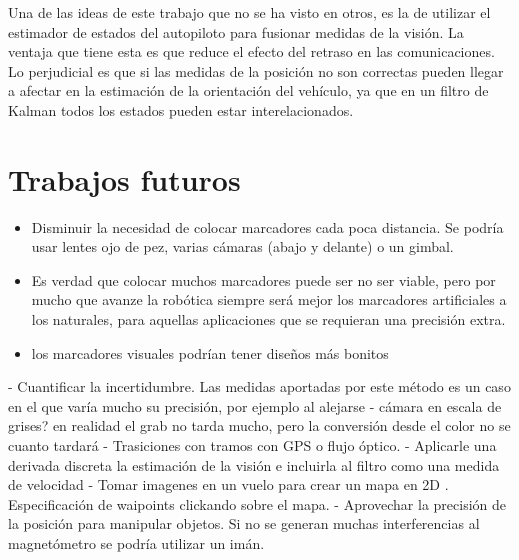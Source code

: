 Una de las ideas de este trabajo que no se ha visto en otros, es la de utilizar el estimador de estados del autopiloto para fusionar medidas de la visión. La ventaja que tiene esta es que reduce el efecto del retraso en las comunicaciones. Lo perjudicial es que si las medidas de la posición no son correctas pueden llegar a afectar en la estimación de la orientación del vehículo, ya que en un filtro de Kalman todos los estados pueden estar interelacionados. 



 





\chapter{Trabajos futuros}


 
	\begin{itemize}
	\item Disminuir la necesidad de colocar marcadores cada poca distancia. Se podría usar lentes ojo de pez, varias cámaras (abajo y delante) o un gimbal.  
	\item Es verdad que colocar muchos marcadores puede ser no ser viable, pero por mucho que avanze la robótica siempre será mejor los marcadores artificiales a los naturales, para aquellas aplicaciones que se requieran una precisión extra.
	\item los marcadores visuales podrían tener diseños más bonitos
	\end{itemize}

	- Cuantificar la incertidumbre. Las medidas aportadas por este método es un caso en el que varía mucho su precisión, por ejemplo al alejarse
	- cámara en escala de grises? en realidad el grab no tarda mucho, pero la conversión desde el color no se cuanto tardará
	- Trasiciones con tramos con GPS o flujo óptico.
	- Aplicarle una derivada discreta la estimación de la visión e incluirla al filtro como una medida de velocidad
	- Tomar imagenes en un vuelo para crear un mapa en 2D . Especificación de waipoints clickando sobre el mapa.
	- Aprovechar la precisión de la posición para manipular objetos. Si no se generan muchas interferencias al magnetómetro se podría utilizar un imán.

\endinput
